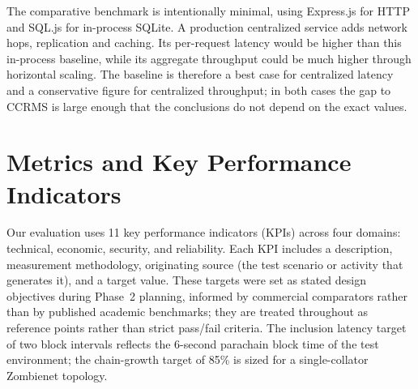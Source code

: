 The comparative benchmark is intentionally minimal, using Express.js for HTTP and SQL.js for in-process SQLite. A production centralized service adds network hops, replication and caching. Its per-request latency would be higher than this in-process baseline, while its aggregate throughput could be much higher through horizontal scaling. The baseline is therefore a best case for centralized latency and a conservative figure for centralized throughput; in both cases the gap to CCRMS is large enough that the conclusions do not depend on the exact values.

\section{Metrics and Key Performance Indicators}\label{sec:kpis}

Our evaluation uses 11 key performance indicators (KPIs) across four domains: technical, economic, security, and reliability. Each KPI includes a description, measurement methodology, originating source (the test scenario or activity that generates it), and a target value. These targets were set as stated design objectives during Phase~2 planning, informed by commercial comparators rather than by published academic benchmarks; they are treated throughout as reference points rather than strict pass/fail criteria. The inclusion latency target of two block intervals reflects the 6-second parachain block time of the test environment; the chain-growth target of 85\% is sized for a single-collator Zombienet topology.

